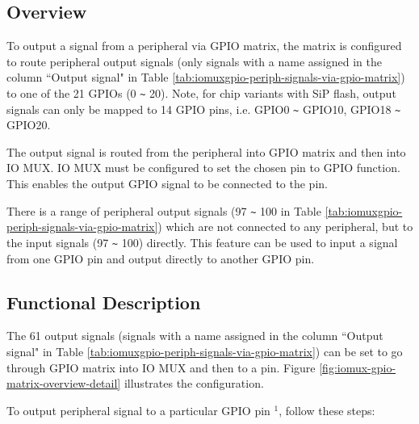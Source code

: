 \documentclass[main\_\_EN.tex]{subfiles}
\begin{document}
\subsection{Overview}

To output a signal from a peripheral via GPIO matrix, the matrix is configured to route peripheral output signals (only signals with a name assigned in the column ``Output signal" in Table \ref{tab:iomuxgpio-periph-signals-via-gpio-matrix}) to one of the 21 GPIOs (0 \verb+~+ 20). Note, for chip variants with SiP flash, output signals can only be mapped to 14 GPIO pins, i.e. GPIO0 \verb+~+ GPIO10, GPIO18 \verb+~+ GPIO20.

The output signal is routed from the peripheral into GPIO matrix and then into IO MUX. IO MUX must be configured to set the chosen pin to GPIO function. This enables the output GPIO signal to be connected to the pin.

\begin{tiplisting}
There is a range of peripheral output signals (97 \verb+~+ 100 in Table  \ref{tab:iomuxgpio-periph-signals-via-gpio-matrix}) which are not connected to any peripheral, but to the input signals (97 \verb+~+ 100) directly. This feature can be used to input a signal from one GPIO pin and output directly to another GPIO pin.
\end{tiplisting}
\vspace{-2em}
\subsection{Functional Description}\label{IOMUXPeripheralOutput}

The 61 output signals (signals with a name assigned in the column ``Output signal" in Table  \ref{tab:iomuxgpio-periph-signals-via-gpio-matrix}) can be set to go through GPIO matrix into IO MUX and then to a pin. Figure  \ref{fig:iomux-gpio-matrix-overview-detail} illustrates the configuration.

To output peripheral signal  to a particular GPIO pin \hyperref[output-note-1]{$^1$}, follow these steps:
\end{document}
